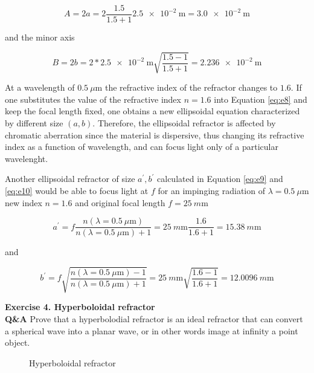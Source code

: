 \documentclass[main.tex]{subfiles}
\begin{document}
\begin{equation}
A = 2a = 2\frac{1.5}{1.5 + 1} \SI{2.5e-2}{\meter} = \SI{3.0e-2}{\meter}
\end{equation}

and the minor axis 

\begin{equation}
B = 2b = 2* \SI{2.5e-2}{\meter}\sqrt{\frac{1.5-1}{1.5+1}} = \SI{2.236e-2}{\meter}
\end{equation}

At a wavelength of $\SI{0.5}{\mu \meter}$ the refractive index of the refractor changes to $1.6$. If one substitutes the value of the refractive index $n=1.6$ into Equation \ref{eq:e8} and keep the focal length fixed, one obtains a new ellipsoidal equation characterized by different size $(a,b)$. Therefore, the ellipsoidal refractor is affected by chromatic aberration since the material is dispersive, thus changing its refractive index as a function of wavelength, and can focus light only of a particular wavelenght.

Another ellipsoidal refractor of size $a^{\prime},b^{\prime}$ calculated in Equation \ref{eq:e9} and \ref{eq:e10} would be able to focus light at $f$ for an impinging radiation of $\lambda=\SI{0.5}{\mu \meter}$ new index $n=1.6$ and original focal length $f=\SI{25}{m\meter}$  

\begin{equation}\label{eq:e9}
a^{\prime} = f\frac{n(\lambda = \SI{0.5}{\mu \meter})}{n(\lambda = \SI{0.5}{\mu \meter})+1} = \SI{25}{m\meter} \frac{1.6}{1.6 + 1} = \SI{15.38}{m\meter}
\end{equation}

and

\begin{equation}\label{eq:e10}
b^{\prime} = f\sqrt{\frac{n(\lambda = \SI{0.5}{\mu \meter})-1}{n(\lambda = \SI{0.5}{\mu \meter})+1}} =  \SI{25}{m\meter} \sqrt{\frac{1.6-1}{1.6+1}} = \SI{12.0096}{m\meter} 
\end{equation}

\textbf{Exercise 4. Hyperboloidal refractor}\\
\textbf{Q\&A} Prove that a hyperbolodial refractor is an ideal refractor that can convert a spherical wave into a planar wave, or in other words image at infinity a point object.\\

\begin{figure}
\centering{}
\caption{Hyperboloidal refractor}
\label{fig:4}
\end{figure}
\end{document}
